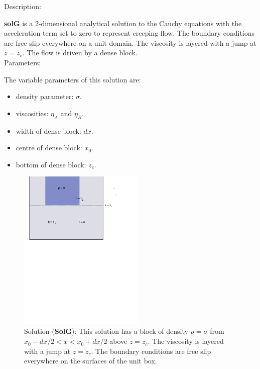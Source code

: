   {\large \fontB Description:}
  
  {\bf solG} is a 2-dimensional analytical solution to the Cauchy equations with the acceleration term set to zero
  to represent creeping flow. The boundary conditions are free-slip everywhere on a unit domain. 
  The viscosity is layered with a jump at $ z=z_c $.
  The flow is driven by a dense block.
  \\

  {\large \fontB Parameters:}
 
  The variable parameters of this solution are:
  \begin{itemize}
    \item{density parameter: $ \sigma $.}
    \item{viscosities: $\eta_A$ and $\eta_B$.}
    \item{width of dense block: $dx$.}
    \item{centre of dense block: $x_0$.}
    \item{bottom of dense block: $z_c$.}
    \end{itemize}

  \begin{figure}
    \includegraphics[width=6cm,clip]{../figs/figG.pdf}
    \caption[Short caption]{\label{figG} 
      Solution ({\bf SolG}):
      This solution has a block of density $\rho = \sigma$ from $x_0-dx/2 < x < x_0+dx/2$ above
      $ z= z_c$.
      The viscosity is layered with a jump at $ z=z_c $.
      The boundary conditions are free slip everywhere on the surfaces of the unit box.}
  \end{figure} 
  

